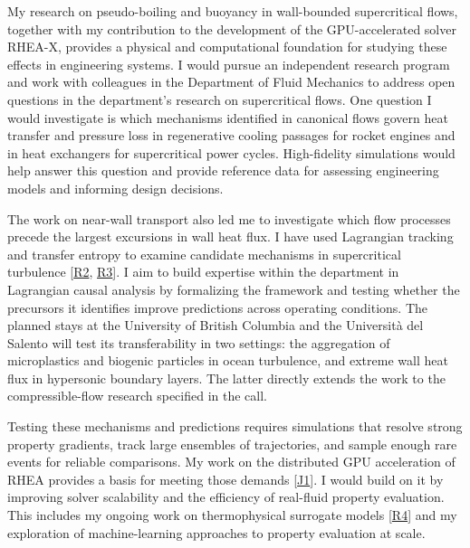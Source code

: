 \documentclass[11pt]{article}
\begin{document}
My research on pseudo-boiling and buoyancy in wall-bounded supercritical flows, together with my contribution to the development of the GPU-accelerated solver RHEA-X, provides a physical and computational foundation for studying these effects in engineering systems. I would pursue an independent research program and work with colleagues in the Department of Fluid Mechanics to address open questions in the department's research on supercritical flows.
One question I would investigate is which mechanisms identified in canonical flows govern heat transfer and pressure loss in regenerative cooling passages for rocket engines and in heat exchangers for supercritical power cycles.
High-fidelity simulations would help answer this question and provide reference data for assessing engineering models and informing design decisions.

The work on near-wall transport also led me to investigate which flow processes precede the largest excursions in wall heat flux. 
I have used Lagrangian tracking and transfer entropy to examine candidate mechanisms in supercritical
turbulence [\hyperlink{pub-R2}{R2}, \hyperlink{pub-R3}{R3}]. 
I aim to build expertise within the department in Lagrangian causal analysis by formalizing the framework and testing whether the precursors it identifies improve predictions across operating conditions. 
The planned stays at the University of British Columbia and the Universit\`a del Salento will test its transferability in two settings: the aggregation of microplastics and biogenic particles in ocean turbulence, and extreme wall heat flux in hypersonic boundary layers. 
The latter directly extends the work to the compressible-flow research specified in the call.

Testing these mechanisms and predictions requires simulations that resolve strong property gradients, track large ensembles of trajectories, and sample enough rare events for reliable comparisons. 
My work on the distributed GPU acceleration of RHEA provides a basis for meeting those
demands [\hyperlink{pub-J1}{J1}]. 
I would build on it by improving solver scalability and the efficiency of real-fluid property evaluation. This includes my ongoing work on thermophysical surrogate models [\hyperlink{pub-R4}{R4}] and my exploration of machine-learning approaches to property evaluation at scale.
\end{document}
